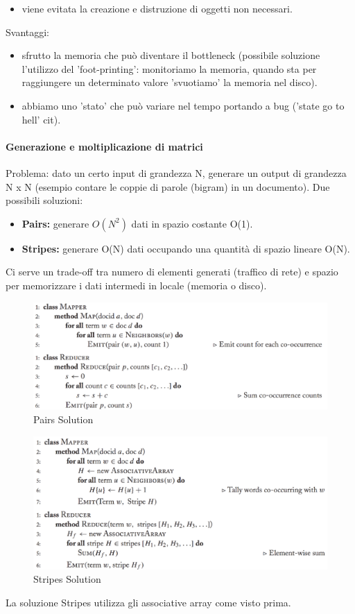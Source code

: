 \documentclass{article}
\begin{document}
\begin{appendices}
\begin{itemize}
    \item viene evitata la creazione e distruzione di oggetti non necessari.
\end{itemize}
Svantaggi:
\begin{itemize}
    \item sfrutto la memoria che può diventare il bottleneck (possibile soluzione l'utilizzo del 'foot-printing': monitoriamo la memoria, quando sta per raggiungere un determinato valore 'svuotiamo' la memoria nel disco).
    \item abbiamo uno 'stato' che può variare nel tempo portando a bug ('state go to hell' cit).
\end{itemize}

\paragraph{Generazione e moltiplicazione di matrici}
Problema: dato un certo input di grandezza N, generare un output di grandezza N x N (esempio contare le coppie di parole (bigram) in un documento). Due possibili soluzioni:
\begin{itemize}
    \item \textbf{Pairs:} generare $O(N^2)$ dati in spazio costante O(1).
    \item \textbf{Stripes:} generare O(N) dati occupando una quantità di spazio lineare O(N).  
\end{itemize}
Ci serve un trade-off tra numero di elementi generati (traffico di rete) e spazio per memorizzare i dati intermedi in locale (memoria o disco).
\begin{figure}[H]
    \centering
    \includegraphics[scale=0.5]{img/Pairs.PNG}
    \caption{Pairs Solution}
\end{figure}
\begin{figure}[H]
    \centering
    \includegraphics[scale=0.5]{img/Stripes.PNG}
    \caption{Stripes Solution}
\end{figure}
La soluzione Stripes utilizza gli associative array come visto prima.


\end{appendices}
\end{document}
